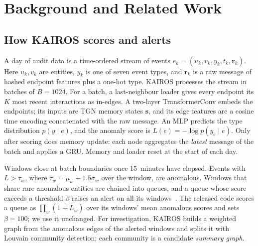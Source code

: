 \documentclass[conference]{IEEEtran}
\begin{document}
\section{Background and Related Work}
\label{sec:background}
\subsection{How KAIROS scores and alerts}
A day of audit data is a time-ordered stream of events $e_k=(u_k,v_k,y_k,t_k,\mathbf{r}_k)$. Here
$u_k,v_k$ are entities, $y_k$ is one of seven event types, and $\mathbf{r}_k$ is a raw message of hashed
endpoint features plus a one-hot type. KAIROS processes the stream in batches of $B{=}1024$. For a batch,
a last-neighbour loader gives every endpoint its $K$ most recent interactions as in-edges. A two-layer
TransformerConv embeds the endpoints; its inputs are TGN memory states $\mathbf{s}$, and its edge features
are a cosine time encoding concatenated with the raw message. An MLP predicts the type distribution
$p(y\mid e)$, and the anomaly score is $L(e)=-\log p(y_e\mid e)$. Only after scoring does memory update:
each node aggregates the \emph{latest} message of the batch and applies a GRU. Memory and loader reset at
the start of each day.

Windows close at batch boundaries once 15~minutes have elapsed. Events with $L>\tau_w$, where
$\tau_w=\mu_w+1.5\sigma_w$ over the window, are anomalous. Windows that share rare anomalous entities are
chained into queues, and a queue whose score exceeds a threshold $\beta$ raises an alert on all its
windows~\cite{kairos}. The released code scores a queue as $\prod_w(1+\bar L_w)$ over its windows' mean
anomalous scores and sets $\beta{=}100$; we use it unchanged. For investigation, KAIROS builds a weighted
graph from the anomalous edges of the alerted windows and splits it with Louvain community detection; each
community is a candidate \emph{summary graph}.
\end{document}
